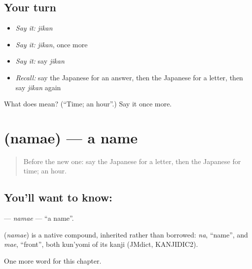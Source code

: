 \subsection*{Your turn}
\begin{itemize}
\raggedright
  \item \emph{Say it:} \emph{jikan}
  \item \emph{Say it:} \emph{jikan}, once more
  \item \emph{Say it:} say \emph{jikan}
  \item \emph{Recall:} say the Japanese for an answer, then the Japanese for a letter, then say \emph{jikan} again
\end{itemize}

\begin{tcolorbox}[breakable,colback=teal!4,colframe=teal!35!black,title={Before you move on}]
What does  mean? (\textquotedblleft{}Time; an hour\textquotedblright{}.) Say it once more.
\end{tcolorbox}
\section[\texorpdfstring{\ja{なまえ} (namae)}{なまえ (namae)}]{ (namae) — a name}

\label{lesson:JA-C41-namae}



\begin{quote}
Before the new one: say the Japanese for a letter, then the Japanese for time; an hour.
\end{quote}

\subsection*{You'll want to know: }
\textbf{} — \emph{namae} — \textquotedblleft{}a name\textquotedblright{}.

\begin{cousinweb}
\textbf{} (\emph{namae}) is a native compound, inherited rather than borrowed: \emph{na}, \textquotedblleft{}name\textquotedblright{}, and \emph{mae}, \textquotedblleft{}front\textquotedblright{}, both kun'yomi of its kanji (JMdict, KANJIDIC2).
\end{cousinweb}

\begin{grammarlens}[title={What you've built}]
One more word for this chapter.
\end{grammarlens}

